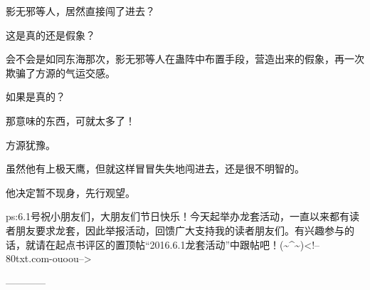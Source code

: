 \begin{this_body}
影无邪等人，居然直接闯了进去？

这是真的还是假象？

会不会是如同东海那次，影无邪等人在蛊阵中布置手段，营造出来的假象，再一次欺骗了方源的气运交感。

如果是真的？

那意味的东西，可就太多了！

方源犹豫。

虽然他有上极天鹰，但就这样冒冒失失地闯进去，还是很不明智的。

他决定暂不现身，先行观望。

ps:6.1号祝小朋友们，大朋友们节日快乐！今天起举办龙套活动，一直以来都有读者朋友要求龙套，因此举报活动，回馈广大支持我的读者朋友们。有兴趣参与的话，就请在起点书评区的置顶帖“2016.6.1龙套活动”中跟帖吧！(\~{}\^{}\~{})<!--80txt.com-ouoou-->

------------

\end{this_body}

